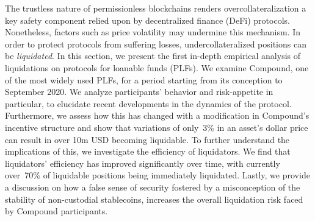 The trustless nature of permissionless blockchains renders overcollateralization a key safety component relied upon by decentralized finance (DeFi) protocols.
Nonetheless, factors such as price volatility may undermine this mechanism. 
In order to protect protocols from suffering losses, undercollateralized positions can be \textit{liquidated}.
In this section, we present the first in-depth empirical analysis of liquidations on protocols for loanable funds (PLFs).
We examine Compound, one of the most widely used PLFs, for a period starting from its conception to September 2020.
We analyze participants' behavior and risk-appetite in particular, to elucidate recent developments in the dynamics of the protocol.
Furthermore, we assess how this has changed with a modification in Compound's incentive structure and show that variations of only~3\% in an asset's dollar price can result in over 10m USD becoming liquidable.
To further understand the implications of this, we investigate the efficiency of liquidators.
We find that liquidators' efficiency has improved significantly over time, with currently over~70\% of liquidable positions being immediately liquidated.
Lastly, we provide a discussion on how a false sense of security fostered by a misconception of the stability of non-custodial stablecoins, increases the overall liquidation risk faced by Compound participants.
